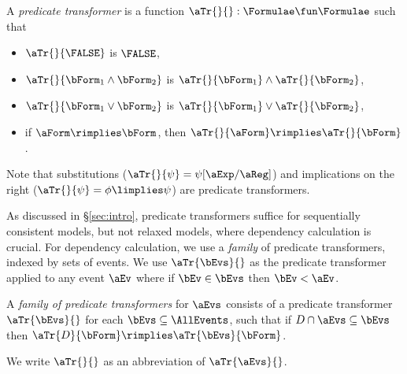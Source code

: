 \begin{definition}
  \label{def:trans}
  A \emph{predicate transformer} is a %
  function
  $\aTr{}{}:\Formulae\fun\Formulae$ such that
  \begin{itemize}
  \item $\aTr{}{\FALSE}$ is $\FALSE$,    
  \item $\aTr{}{\bForm_1\land\bForm_2}$ is $\aTr{}{\bForm_1}\land\aTr{}{\bForm_2}$,    
  \item $\aTr{}{\bForm_1\lor\bForm_2}$ is $\aTr{}{\bForm_1}\lor\aTr{}{\bForm_2}$, 
  \item if $\aForm \rimplies \bForm$, then $\aTr{}{\aForm} \rimplies \aTr{}{\bForm}$.
  \end{itemize}
\end{definition}
\noindent
Note that substitutions ($\aTr{}{\psi}=\psi[\aExp/\aReg]$) and implications on the right
($\aTr{}{\psi}=\phi\limplies\psi$) are predicate transformers.

As discussed in \S\ref{sec:intro}, predicate transformers suffice for sequentially consistent
models, but not relaxed models, where dependency calculation is crucial.
For dependency calculation, we use a \emph{family} of predicate transformers,
indexed by sets of events. We use $\aTr{\bEvs}{}$ as the predicate transformer
applied to any event $\aEv$ where if $\bEv\in\bEvs$ then $\bEv<\aEv$.

\begin{definition}
  \label{def:family}
  A \emph{family of predicate transformers} for $\aEvs$ consists of a
  predicate transformer $\aTr{\bEvs}{}$ for each $\bEvs\subseteq\AllEvents$,
  such that if $\cEvs \cap \aEvs \subseteq \bEvs$ then $\aTr{\cEvs}{\bForm}
  \rimplies \aTr{\bEvs}{\bForm}$.

  We write $\aTr{}{}$ as an abbreviation of $\aTr{\aEvs}{}$.
\end{definition}


